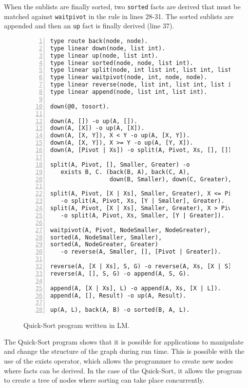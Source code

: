 When the sublists are finally sorted, two \texttt{sorted} facts are derived that
must be matched against \texttt{waitpivot} in the rule in lines 28-31. The sorted
sublists are appended and then an \texttt{up} fact is finally derived (line 37).

\begin{figure}[h!]
\begin{Verbatim}[numbers=left,fontsize=\scriptsize]
type route back(node, node).
type linear down(node, list int).
type linear up(node, list int).
type linear sorted(node, node, list int).
type linear split(node, int list int, list int, list int).
type linear waitpivot(node, int, node, node).
type linear reverse(node, list int, list int, list int).
type linear append(node, list int, list int).

down(@0, tosort).

down(A, []) -o up(A, []).
down(A, [X]) -o up(A, [X]).
down(A, [X, Y]), X < Y -o up(A, [X, Y]).
down(A, [X, Y]), X >= Y -o up(A, [Y, X]).
down(A, [Pivot | Xs]) -o split(A, Pivot, Xs, [], []).

split(A, Pivot, [], Smaller, Greater) -o
   exists B, C. (back(B, A), back(C, A),
                 down(B, Smaller), down(C, Greater), waitpivot(A, Pivot, B, C)).

split(A, Pivot, [X | Xs], Smaller, Greater), X <= Pivot
   -o split(A, Pivot, Xs, [Y | Smaller], Greater).
split(A, Pivot, [X | Xs], Smaller, Greater), X > Pivot
   -o split(A, Pivot, Xs, Smaller, [Y | Greater]).
   
waitpivot(A, Pivot, NodeSmaller, NodeGreater),
sorted(A, NodeSmaller, Smaller),
sorted(A, NodeGreater, Greater)
   -o reverse(A, Smaller, [], [Pivot | Greater]).

reverse(A, [X | Xs], S, G) -o reverse(A, Xs, [X | S], G).
reverse(A, [], S, G) -o append(A, S, G).

append(A, [X | Xs], L) -o append(A, Xs, [X | L]).
append(A, [], Result) -o up(A, Result).

up(A, L), back(A, B) -o sorted(B, A, L).
\end{Verbatim}
  \caption{Quick-Sort program written in LM.}
  \label{language:code:quicksort}
\end{figure}

The Quick-Sort program shows that it is possible for applications to manipulate
and change the structure of the graph during run time. This is possible with the
use of the exists operator, which allows the programmer to create new nodes
where facts can be derived. In the case of the Quick-Sort, it allows the program
to create a tree of nodes where sorting can take place concurrently.

